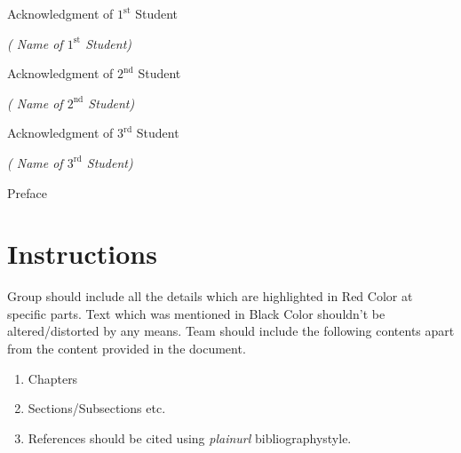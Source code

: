 \documentclass[11pt,a4paper]{report}
\begin{document}
{\color{red} Acknowledgment of $1^{\text{st}}$ Student} \\
\begin{flushright}
\textit{({\color{red} Name of $1^{\text{st}}$ Student})}\\[1\baselineskip]
\end{flushright} 

{\color{red} Acknowledgment of $2^{\text{nd}}$ Student} \\
\begin{flushright}
\textit{({\color{red} Name of $2^{\text{nd}}$ Student})}\\[1\baselineskip]
\end{flushright} 

{\color{red} Acknowledgment of $3^{\text{rd}}$ Student} \\
\begin{flushright}
\textit{({\color{red} Name of $3^{\text{rd}}$ Student})}\\[1\baselineskip]
\end{flushright} 

\newpage

\vspace*{3\baselineskip}
\begin{center}
\begin{LARGE}
{\color{blue} Preface} \\[3\baselineskip]
\end{LARGE}
\end{center}

\newpage 

\tableofcontents
{}
\listoffigures
\listoftables

\newpage
{}

\chapter{Instructions}

Group should include all the details which are highlighted in Red Color at specific parts. Text which was mentioned in Black Color shouldn't be altered/distorted by any means. Team should include the following contents apart from the content provided in the document.
\begin{enumerate}
\item Chapters
\item Sections/Subsections etc.
\item References should be cited using \textit{plainurl} bibliographystyle.
\end{enumerate}
\end{document}
